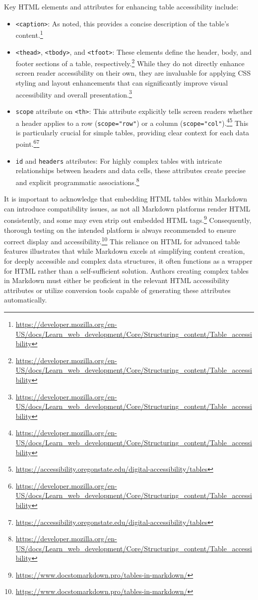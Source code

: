 Key HTML elements and attributes for enhancing table accessibility include:
\begin{itemize}[noitemsep,topsep=0pt]
    \item \texttt{<caption>}: As noted, this provides a concise description of the table's content.\footnote{\url{https://developer.mozilla.org/en-US/docs/Learn_web_development/Core/Structuring_content/Table_accessibility}}
    \item \texttt{<thead>}, \texttt{<tbody>}, and \texttt{<tfoot>}: These elements define the header, body, and footer sections of a table, respectively.\footnote{\url{https://developer.mozilla.org/en-US/docs/Learn_web_development/Core/Structuring_content/Table_accessibility}} While they do not directly enhance screen reader accessibility on their own, they are invaluable for applying CSS styling and layout enhancements that can significantly improve visual accessibility and overall presentation.\footnote{\url{https://developer.mozilla.org/en-US/docs/Learn_web_development/Core/Structuring_content/Table_accessibility}}
    \item \texttt{scope} attribute on \texttt{<th>}: This attribute explicitly tells screen readers whether a header applies to a row (\texttt{scope="row"}) or a column (\texttt{scope="col"}).\footnote{\url{https://developer.mozilla.org/en-US/docs/Learn_web_development/Core/Structuring_content/Table_accessibility}}\footnote{\url{https://accessibility.oregonstate.edu/digital-accessibility/tables}} This is particularly crucial for simple tables, providing clear context for each data point.\footnote{\url{https://developer.mozilla.org/en-US/docs/Learn_web_development/Core/Structuring_content/Table_accessibility}}\footnote{\url{https://accessibility.oregonstate.edu/digital-accessibility/tables}}
    \item \texttt{id} and \texttt{headers} attributes: For highly complex tables with intricate relationships between headers and data cells, these attributes create precise and explicit programmatic associations.\footnote{\url{https://developer.mozilla.org/en-US/docs/Learn_web_development/Core/Structuring_content/Table_accessibility}}
\end{itemize}
It is important to acknowledge that embedding HTML tables within Markdown can introduce compatibility issues, as not all Markdown platforms render HTML consistently, and some may even strip out embedded HTML tags.\footnote{\url{https://www.docstomarkdown.pro/tables-in-markdown/}} Consequently, thorough testing on the intended platform is always recommended to ensure correct display and accessibility.\footnote{\url{https://www.docstomarkdown.pro/tables-in-markdown/}} This reliance on HTML for advanced table features illustrates that while Markdown excels at simplifying content creation, for deeply accessible and complex data structures, it often functions as a wrapper for HTML rather than a self-sufficient solution. Authors creating complex tables in Markdown must either be proficient in the relevant HTML accessibility attributes or utilize conversion tools capable of generating these attributes automatically.

